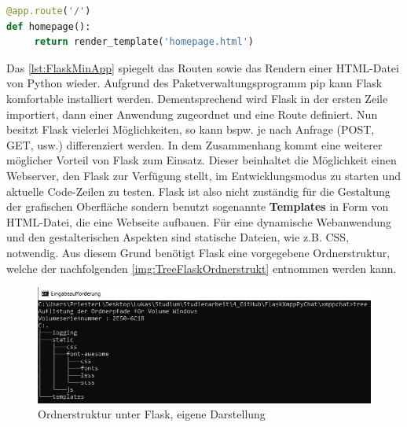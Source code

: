 \documentclass[a4paper,titlepage,halfparskip,12pt]{scrreprt}
\begin{document}
\begin{onehalfspacing}
\begin{lstlisting}[language=Python,caption=Example Listing of Flask Python,label={lst:FlaskMinApp}]
@app.route('/')
def homepage():
	 return render_template('homepage.html')
\end{lstlisting}
Das \autoref{lst:FlaskMinApp} spiegelt das Routen sowie das Rendern einer \ac{HTML}-Datei von Python wieder. Aufgrund des Paketverwaltungsprogramm pip kann Flask komfortable installiert werden. Dementsprechend wird Flask in der ersten Zeile importiert, dann einer Anwendung zugeordnet und eine Route definiert. Nun besitzt Flask vielerlei Möglichkeiten, so kann bspw. je nach Anfrage (POST, GET, usw.) differenziert werden. In dem Zusammenhang kommt eine weiterer möglicher Vorteil von Flask zum Einsatz. Dieser beinhaltet die Möglichkeit einen Webserver, den Flask zur Verfügung stellt, im Entwicklungsmodus zu starten und aktuelle Code-Zeilen zu testen.
Flask ist also nicht zuständig für die Gestaltung der grafischen Oberfläche sondern benutzt sogenannte \textbf{Templates} in Form von HTML-Datei, die eine Webseite aufbauen. Für eine dynamische Webanwendung und den gestalterischen Aspekten sind statische Dateien, wie z.B. \ac{CSS}, notwendig. Aus diesem Grund benötigt Flask eine vorgegebene Ordnerstruktur, welche der nachfolgenden \autoref{img:TreeFlaskOrdnerstrukt} entnommen werden kann.
\begin{figure}[h]
	\centering
	\includegraphics[width=\textwidth]{images/TreeFlaskOrdnerstrukt}
	\caption{Ordnerstruktur unter Flask, eigene Darstellung}
	\label{img:TreeFlaskOrdnerstrukt}
\end{figure}

\end{onehalfspacing}
\end{document}
